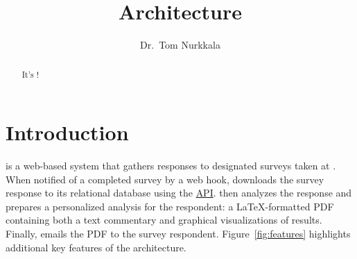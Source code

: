 \documentclass{article}
\title{\caper{} Architecture}
\author{Dr.\ Tom Nurkkala}
\begin{document}
\maketitle

\begin{abstract}
  It's \caper!
\end{abstract}

\tableofcontents

\section{Introduction}
\label{sec:introduction}

\caper{} is a web-based system
that gathers responses to designated surveys taken at {\qual}.
When notified of a completed survey by a \qual{} web hook,
\caper{}
downloads the survey response
to its \pg{} relational database
using the
\qual{} \href{https://api.qualtrics.com/}{\rest{} API}.
\caper{} then
analyzes the response and
prepares a personalized analysis for the respondent:
a \LaTeX-formatted PDF containing both a text commentary
and graphical visualizations of results.
Finally, \caper{}
emails the PDF to the survey respondent.
Figure~\ref{fig:features} highlights additional
key features of the \caper{} architecture.
\end{document}
